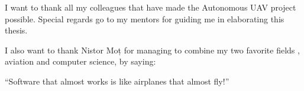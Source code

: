 \vspace*{7cm}
\begin{center}
I want to thank all my colleagues that have made the Autonomous UAV project
possible. Special regards go to my mentors for guiding me in elaborating this
thesis.
\end{center}
\vspace{0.6cm}
\begin{center}
I also want to thank Nistor Moț for managing to combine my two favorite fields
, aviation and computer science,  by saying:

``Software that almost works is like airplanes that almost fly!''
\end{center}
